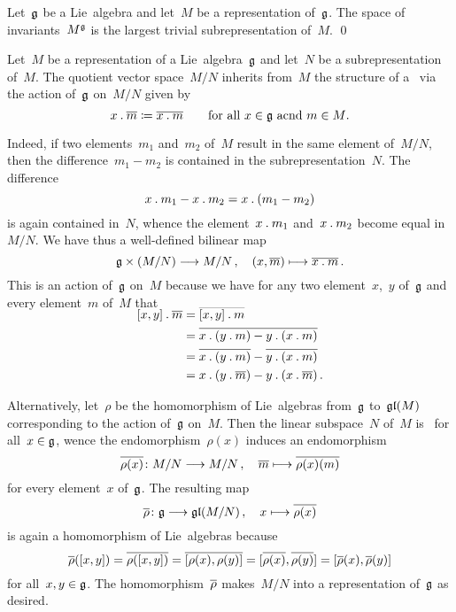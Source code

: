 \begin{proposition}
	Let~$\glie$ be a Lie~algebra and let~$M$ be a representation of~$\glie$.
	The space of invariants~$M^{\mathfrak{g}}$ is the largest trivial subrepresentation of~$M$.
	\qed
\end{proposition}


\begin{example}
	\label{quotient representation}
	Let~$M$ be a representation of a Lie~algebra~$\glie$ and let~$N$ be a subrepresentation of~$M$.
	The quotient vector space~$M/N$ inherits from~$M$ the structure of a~{\representation{$\glie$}} via the action of~$\glie$ on~$M/N$ given by
	\[
		x \mathbin{.} \overline{m}
		\coloneqq
		\overline{x \mathbin{.} m}
		\qquad
		\text{for all~$x \in \mathfrak{g}$ acnd~$m \in M$}.
	\]

	Indeed, if two elements~$m_1$ and~$m_2$ of~$M$ result in the same element of~$M/N$, then the difference~$m_1 - m_2$ is contained in the subrepresentation~$N$.
	The difference
	\[
		x \mathbin{.} m_1 - x \mathbin{.} m_2
		=
		x \mathbin{.} (m_1 - m_2)
	\]
	is again contained in~$N$, whence the element~$x \mathbin{.} m_1$ and~$x \mathbin{.} m_2$ become equal in~$M/N$.
	We have thus a well-defined bilinear map
	\[
		\glie \times (M / N)
		\to
		M / N \,,
		\quad
		(x, \class{m})
		\mapsto
		\class{x \act m} \,.
	\]
	This is an action of~$\glie$ on~$M$ because we have for any two element~$x$,~$y$ of~$\glie$ and every element~$m$ of~$M$ that
	\begin{align*}
		\SwapAboveDisplaySkip
		[x,y] \act \class{m}
		&=
		\class{[x,y] \act m}
		\\
		&=
		\class{x \act (y \act m) - y \act (x \act m)}
		\\
		&=
		\class{x \act (y \act m)} - \class{y \act (x \act m)}
		\\
		&=
		x \act (y \act \class{m}) - y \act (x \act \class{m}) \,.
	\end{align*}
	
	Alternatively, let~$\rho$ be the homomorphism of Lie~algebras from~$\glie$ to~$\mathfrak{gl}(M)$ corresponding to the action of~$\glie$ on~$M$.
	Then the linear subspace~$N$ of~$M$ is~{} for all~$x \in \mathfrak{g}$, wence the endomorphism~$\rho(x)$ induces an endomorphism
	\[
		\induced{\rho(x)}
		\colon
		M/N
		\to
		M/N \,,
		\quad
		\class{m}
		\mapsto
		\class{\rho(x)(m)}
	\]
	for every element~$x$ of~$\glie$.
	The resulting map
	\[
		\induced{\rho}
		\colon
		\glie
		\to
		\gllie(M/N) \,,
		\quad
		x
		\mapsto
		\induced{\rho(x)}
	\]
	is again a homomorphism of Lie~algebras because
	\[
		\overline{\rho}([x,y])
		=
		\overline{\rho([x,y])}
		=
		\overline{[\rho(x), \rho(y)]}
		=
		[\overline{\rho(x)}, \overline{\rho(y)}]
		=
		[\overline{\rho}(x), \overline{\rho}(y)]
	\]
	for all~$x, y \in \mathfrak{g}$.
	The homomorphism~$\overline{\rho}$ makes~$M/N$ into a representation of~$\glie$ as desired.
\end{example}


